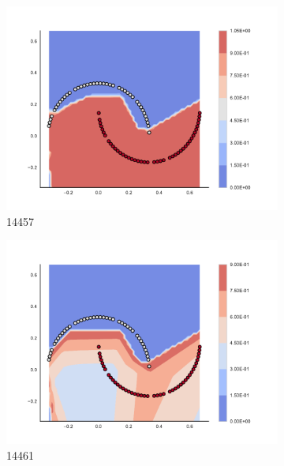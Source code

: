 \begin{figure}[h]
\begin{subfigure}[b]{0.09\textwidth}
    \includegraphics[clip, trim=2.35cm 1.75cm 4.5cm 0cm,width=\textwidth]{img/convergence/14457.pdf}
    \caption{14457}
    \label{fig:convergence_14457}
\end{subfigure}
%
\begin{subfigure}[b]{0.09\textwidth}
    \includegraphics[clip, trim=2.35cm 1.75cm 4.5cm 0cm,width=\textwidth]{img/convergence/14461.pdf}
    \caption{14461}
    \label{fig:convergence_14461}
\end{subfigure}
%
\begin{subfigure}[b]{0.09\textwidth}

\end{subfigure}
\end{figure}
